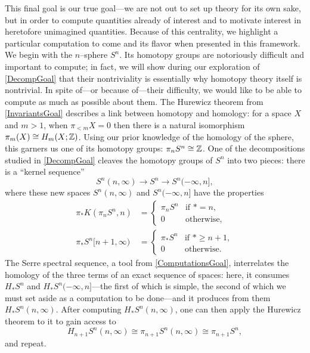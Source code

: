 This final goal is our true goal---we are not out to set up theory for its own sake, but in order to compute quantities already of interest and to motivate interest in heretofore unimagined quantities.  Because of this centrality, we highlight a particular computation to come and its flavor when presented in this framework.  We begin with the $n$--sphere $S^n$.  Its homotopy groups are notoriously difficult and important to compute; in fact, we will show during our exploration of \eqref{DecompGoal} that their nontriviality is essentially why homotopy theory itself is nontrivial.  In spite of---or because of---their difficulty, we would like to be able to compute as much as possible about them.  The Hurewicz theorem from \eqref{InvariantsGoal} describes a link between homotopy and homology: for a space $X$ and $m > 1$, when $\pi_{< m} X = 0$ then there is a natural isomorphism $\pi_m(X) \cong H_m(X; \mathbb Z)$.  Using our prior knowledge of the homology of the sphere, this garners us one of its homotopy groups: $\pi_n S^n \cong \mathbb Z$.  One of the decompositions studied in \eqref{DecompGoal} cleaves the homotopy groups of $S^n$ into two pieces: there is a ``kernel sequence'' \[S^n(n, \infty) \to S^n \to S^n(-\infty, n],\] where these new spaces $S^n(n, \infty)$ and $S^n(-\infty, n]$ have the properties
\begin{align*}
\pi_* K(\pi_n S^n, n) & = \begin{cases} \pi_n S^n & \text{if $* = n$}, \\ 0 & \text{otherwise}, \end{cases} \\
\pi_* S^n[n+1, \infty) & = \begin{cases} \pi_* S^n & \text{if $* \ge n + 1$}, \\ 0 & \text{otherwise}. \end{cases}
\end{align*}
The Serre spectral sequence, a tool from \eqref{ComputationsGoal}, interrelates the homology of the three terms of an exact sequence of spaces: here, it consumes $H_* S^n$ and $H_* S^n(-\infty, n]$---the first of which is simple, the second of which we must set aside as a computation to be done---and it produces from them $H_* S^n(n, \infty)$.  After computing $H_* S^n(n, \infty)$, one can then apply the Hurewicz theorem to it to gain access to \[H_{n+1} S^n(n, \infty) \cong \pi_{n+1} S^n(n, \infty) \cong \pi_{n+1} S^n,\] and repeat.




